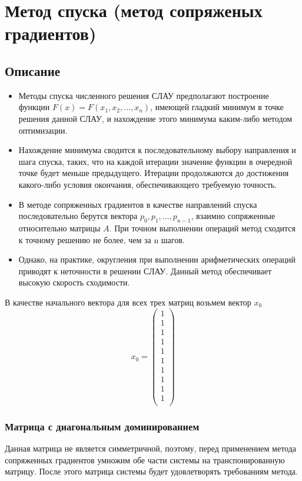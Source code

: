 \documentclass[../../report.tex]{subfiles}
\begin{document}
\chapter{Метод спуска (метод сопряженых градиентов)}

\section{Описание}
\begin{itemize}
  \item Методы спуска численного решения СЛАУ предполагают построение функции $F(x)=F(x_1, x_2, \dots, x_n)$, 
имеющей гладкий минимум в точке решения данной СЛАУ, и нахождение этого
минимума каким-либо методом оптимизации.

  \item Нахождение минимума сводится к последовательному выбору направления и шага спуска, таких, что на каждой итерации значение
функции в очередной точке будет меньше предыдущего. Итерации продолжаются до достижения
какого-либо условия окончания, обеспечивающего требуемую точность.

  \item В методе сопряженных градиентов в качестве направлений спуска последовательно берутся
вектора $p_0, p_1, \dots, p_{n-1}$, взаимно сопряженные относительно матрицы $A$. При точном выполнении
операций метод сходится к точному решению не более, чем за n шагов. 

  \item Однако, на практике, округления при выполнении арифметических операций приводят к неточности в решении СЛАУ.
Данный метод обеспечивает высокую скорость сходимости.
\end{itemize}

В качестве начального вектора для всех трех матриц возьмем вектор $x_0$
\[
x_0 =
\begin{pmatrix}
  1 \\
  1 \\
  1 \\
  1 \\
  1 \\
  1 \\
  1 \\
  1 \\
  1 \\
  1 \\
\end{pmatrix}
\]

\subsection{Матрица с диагональным доминированием}
Данная матрица не является симметричной, поэтому, перед применением метода сопряженных градиентов умножим
обе части системы на транспонированную матрицу.
После этого матрица системы будет удовлетворять требованиям метода.
\end{document}
